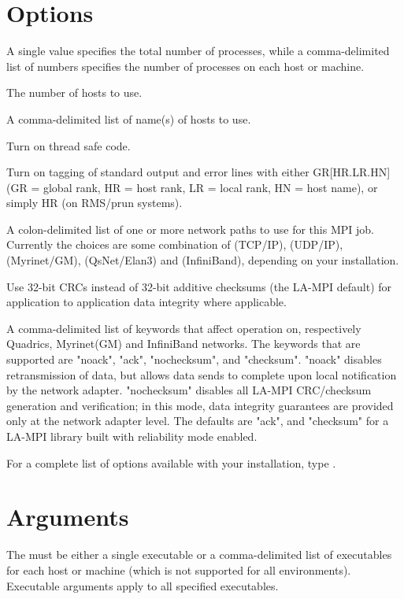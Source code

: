 \documentclass[english]{article}
\begin{document}
\section{Options}
\begin{Description}\setlength{\itemsep}{0cm}
\item[\Opt{-n}\Bar\Opt{-np} \Arg{ number of processes}] A single value
  specifies the total number of processes, while a comma-delimited
  list of numbers specifies the number of processes on each host or
  machine.
\item[\OptArg{-N}{ number of hosts}] The number of hosts to use.
\item[\OptArg{-H}{ hostlist}] A comma-delimited list of name(s) of
  hosts to use.
\item[\Opt{-threads}] Turn on thread safe code.
\item[\Opt{-t}] Turn on tagging of standard output and error lines
  with either GR[HR.LR.HN] (GR = global rank, HR = host rank, LR =
  local rank, HN = host name), or simply HR (on RMS/prun systems).
\item[\OptArg{-dev}{ netpaths}] A colon-delimited list of one or more
  network paths to use for this MPI job. Currently the choices are
  some combination of  (TCP/IP),  (UDP/IP), 
  (Myrinet/GM),  (QsNet/Elan3) and  (InfiniBand),
  depending on your installation.
\item[\Opt{-crc}] Use 32-bit CRCs instead of 32-bit additive checksums
  (the LA-MPI default) for application to application data integrity
  where applicable.
\item[\OptArg{-qf,-mf,-ib}{ flaglist}] A comma-delimited list of
  keywords that affect operation on, respectively Quadrics,
  Myrinet(GM) and InfiniBand networks. The keywords that are supported
  are "noack", "ack", "nochecksum", and "checksum". "noack" disables
  retransmission of data, but allows data sends to complete upon local
  notification by the network adapter. "nochecksum" disables
  all LA-MPI CRC/checksum generation and verification; in this mode,
  data integrity guarantees are provided only at the network adapter
  level. The defaults are "ack", and "checksum" for a LA-MPI library
  built with reliability mode enabled.
\end{Description}

For a complete list of options available with your installation, type
.

\section{Arguments}
The  must be either a single executable or a
comma-delimited list of executables for each host or machine (which is
not supported for all environments). Executable arguments apply to all
specified executables.
\end{document}
